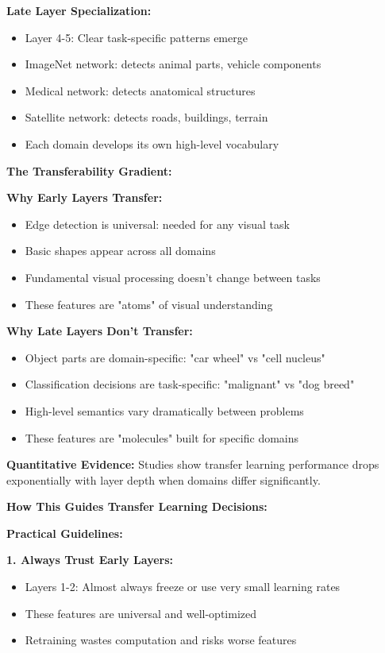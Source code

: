 \documentclass[12pt]{article}
\newcommand{\explanation}[1]{{\color{explanationcolor}#1}}
\begin{document}
\begin{enumerate}[(a)]
{{    \textbf{Late Layer Specialization:}
    \begin{itemize}
        \item Layer 4-5: Clear task-specific patterns emerge
        \item ImageNet network: detects animal parts, vehicle components
        \item Medical network: detects anatomical structures
        \item Satellite network: detects roads, buildings, terrain
        \item Each domain develops its own high-level vocabulary
    \end{itemize}
    }
    
    \textbf{The Transferability Gradient:}
    
    \explanation{
    \textbf{Why Early Layers Transfer:}
    \begin{itemize}
        \item Edge detection is universal: needed for any visual task
        \item Basic shapes appear across all domains
        \item Fundamental visual processing doesn't change between tasks
        \item These features are "atoms" of visual understanding
    \end{itemize}
    
    \textbf{Why Late Layers Don't Transfer:}
    \begin{itemize}
        \item Object parts are domain-specific: "car wheel" vs "cell nucleus"
        \item Classification decisions are task-specific: "malignant" vs "dog breed"
        \item High-level semantics vary dramatically between problems
        \item These features are "molecules" built for specific domains
    \end{itemize}
    
    \textbf{Quantitative Evidence:}
    Studies show transfer learning performance drops exponentially with layer depth when domains differ significantly.
    }
    
    \textbf{How This Guides Transfer Learning Decisions:}
    
    \explanation{
    \textbf{Practical Guidelines:}
    
    \textbf{1. Always Trust Early Layers:}
    \begin{itemize}
        \item Layers 1-2: Almost always freeze or use very small learning rates
        \item These features are universal and well-optimized
        \item Retraining wastes computation and risks worse features
    \end{itemize}
    
}}
\end{enumerate}
\end{document}
